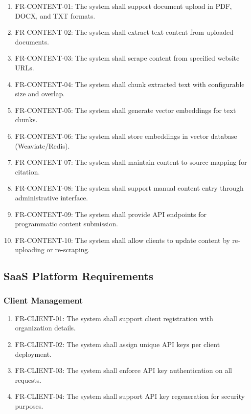 \begin{enumerate}[leftmargin=*]
    \item FR-CONTENT-01: The system shall support document upload in PDF, DOCX, and TXT formats.
    \item FR-CONTENT-02: The system shall extract text content from uploaded documents.
    \item FR-CONTENT-03: The system shall scrape content from specified website URLs.
    \item FR-CONTENT-04: The system shall chunk extracted text with configurable size and overlap.
    \item FR-CONTENT-05: The system shall generate vector embeddings for text chunks.
    \item FR-CONTENT-06: The system shall store embeddings in vector database (Weaviate/Redis).
    \item FR-CONTENT-07: The system shall maintain content-to-source mapping for citation.
    \item FR-CONTENT-08: The system shall support manual content entry through administrative interface.
    \item FR-CONTENT-09: The system shall provide API endpoints for programmatic content submission.
    \item FR-CONTENT-10: The system shall allow clients to update content by re-uploading or re-scraping.
\end{enumerate}

\subsection{SaaS Platform Requirements}

\subsubsection{Client Management}

\begin{enumerate}[leftmargin=*]
    \item FR-CLIENT-01: The system shall support client registration with organization details.
    \item FR-CLIENT-02: The system shall assign unique API keys per client deployment.
    \item FR-CLIENT-03: The system shall enforce API key authentication on all requests.
    \item FR-CLIENT-04: The system shall support API key regeneration for security purposes.
\end{enumerate}

